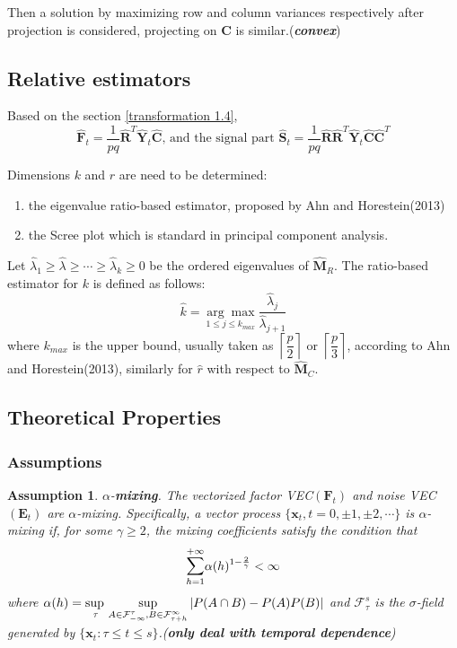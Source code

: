 \documentclass{article}[12pt]
\def\lc{\left\lceil}
\def\rc{\right\rceil}
\newtheorem{assumption}{Assumption}
\begin{document}
\noindent Then a solution by maximizing row and column variances respectively after projection is considered, projecting on $\mathbf{C}$ is similar.(\textbf{\textit{convex}})


\subsection{Relative estimators}
Based on the section \ref{transformation 1.4}, 
$$\mathbf{\widehat{F}}_t = \dfrac{1}{pq}\mathbf{\widehat{R}}^T\mathbf{\widehat{Y}}_t\mathbf{\widehat{C}}\text{, and the signal part }\mathbf{\widehat{S}}_t = \dfrac{1}{pq}\mathbf{\widehat{R}}\mathbf{\widehat{R}}^T\mathbf{\widehat{Y}}_t\mathbf{\widehat{C}}\mathbf{\widehat{C}}^T$$
 
\noindent Dimensions $k$ and $r$ are need to be determined:
\begin{enumerate}
    \item the eigenvalue ratio-based estimator, proposed by Ahn and Horestein(2013) 
    \item the Scree plot which is standard in principal component analysis. 
\end{enumerate}
\noindent Let $\hat{\lambda}_1 \geq \hat{\lambda} \geq \cdots \geq \hat{\lambda}_k \geq 0$ be the ordered eigenvalues of $\mathbf{\widehat{M}}_R$. The ratio-based estimator for $k$ is defined as follows:
    $$\widehat{k} = \underset{1 \leq j \leq k_{max}}{\arg\max }\dfrac{\widehat{\lambda}_j}{\widehat{\lambda}_{j+1}}$$
    where $k_{max}$ is the upper bound, usually taken as $\lc\dfrac{p}{2}\rc$ or $\lc\dfrac{p}{3}\rc$, according to Ahn and Horestein(2013),  similarly for $\widehat{r}$ with respect to $\mathbf{\widehat{M}}_C$.  
\subsection{Theoretical Properties}
\subsubsection{Assumptions}
\begin{assumption}\label{assumption 1 1.7.1}
    $\alpha$-\textbf{mixing}. \normalfont The vectorized factor VEC$(\mathbf{F}_t)$ and noise VEC$(\mathbf{E}_t)$ are $\alpha$-mixing. Specifically, a vector process $\{\mathbf{x}_t, t=0, \pm 1,\pm 2,\cdots\}$ is $\alpha$-mixing if, for some $\gamma \geq 2$, the mixing coefficients satisfy the condition that
    $$\mathlarger{\sum}_{h=1}^{+\infty} \alpha(h)^{1-\frac{2}{\gamma}} < \infty$$
    where $\alpha(h) =  \adjustlimits\sup_{\tau}\sup_{A \in \mathcal{F}_{-\infty}^{\tau}, B \in \mathcal{F}_{\tau + h}^{\infty}}|P(A\cap B)-P(A)P(B)|$ and $\mathcal{F}_{\tau}^s$ is the $\sigma$-field generated by $\{\mathbf{x}_t:\tau \leq t \leq s\}$.(\textbf{\textit{only deal with temporal dependence}})
\end{assumption}
 
\end{document}
